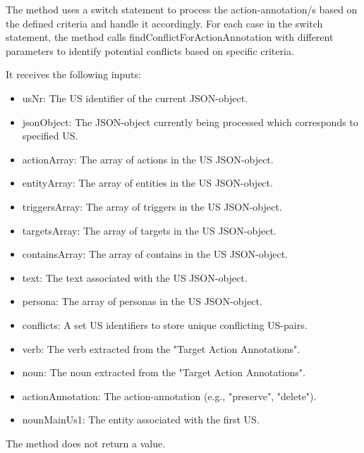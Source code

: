 \begin{itemize}
	The method uses a switch statement to process the action-annotation/s based on the defined criteria and handle it accordingly. For each case in the switch statement, the method calls findConflictForActionAnnotation with different parameters to identify potential conflicts based on specific criteria.
	
	It receives the following inputs:
	\begin{itemize}
		\item usNr: The US identifier of the current JSON-object.
		
		\item jsonObject: The JSON-object currently being processed which corresponds to specified US.
		
		\item actionArray: The array of actions in the US JSON-object.
		
		\item entityArray: The array of entities in the US JSON-object.
		
		\item triggersArray: The array of triggers in the US JSON-object.
		
		\item targetsArray: The array of targets in the US JSON-object.
		
		\item containsArray: The array of contains in the US JSON-object.
		
		\item text: The text associated with the US JSON-object.
		
		\item persona: The array of personas in the US JSON-object.
		
		\item conflicts: A set US identifiers to store unique conflicting US-pairs.
		
		\item verb: The verb extracted from the "Target Action Annotations".
		
		\item noun: The noun extracted from the "Target Action Annotations".
		
		\item actionAnnotation: The action-annotation (e.g., "preserve", "delete").
		
		\item nounMainUs1: The entity associated with the first US.
	\end{itemize}
	The method does not return a value.
	

\end{itemize}
